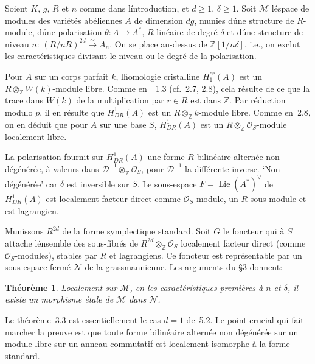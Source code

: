 \documentclass[11pt,a4paper]{article}
\theoremstyle{plain}
\newtheorem{theorem}{Th\'eor\`eme}
\theoremstyle{definition}
\DeclareMathOperator{\Lie}{Lie}
\begin{document}
Soient $K$, $g$, $R$ et $n$ comme dans l\'introduction, et $d \geq 1$, $\delta \geq 1$. Soit $\mathscr{M}$
l\'espace de modules des vari\'et\'es ab\'eliennes $A$ de dimension $dg$, munies d\'une
structure de $R$-module, d\'une polarisation $\theta: A \to A^*$, $R$-lin\'eaire de degr\'e $\delta$ et
d\'une structure de niveau $n$: $(R/nR)^{2d} \xrightarrow{\sim} A_n$. On se place au-dessus de $\mathbb{Z}[1/n\delta]$,
i.e., on exclut les caract\'eristiques divisant le niveau ou le degr\'e de la polarisation.

Pour $A$ sur un corps parfait $k$, l\'homologie cristalline $H^{cr}_1(A)$ est un
$R \otimes_\mathbb{Z} W(k)$-module libre. Comme en~\cite{Rapoport}~1.3 (cf.~2.7, 2.8), cela r\'esulte de ce que
la trace dans $W(k)$ de la multiplication par $r \in R$ est dans $\mathbb{Z}$. Par r\'eduction
modulo $p$, il en r\'esulte que $H^1_{DR}(A)$ est un $R \otimes_\mathbb{Z} k$-module libre. Comme en~2.8,
on en d\'eduit que pour $A$ sur une base $S$, $H^1_{DR}(A)$ est un $R \otimes_\mathbb{Z} \mathscr{O}_S$-module
localement libre.

La polarisation fournit sur $H^1_{DR}(A)$ une forme $R$-bilin\'eaire altern\'ee non
d\'eg\'en\'er\'ee, \`a valeurs dans $\mathscr{D}^{-1} \otimes_\mathbb{Z} \mathscr{O}_S$, pour $\mathscr{D}^{-1}$ la diff\'erente inverse. `Non
d\'eg\'en\'er\'ee' car $\delta$ est inversible sur $S$. Le sous-espace $F = \Lie(A^*)^\vee$ de $H^1_{DR}(A)$
est localement facteur direct
comme $\mathscr{O}_S$-module, un $R$-sous-module et est lagrangien.

Munissons $R^{2d}$ de la forme symplectique standard. Soit $G$ le foncteur qui \`a
$S$ attache l\'ensemble des sous-fibr\'es de $R^{2d} \otimes_\mathbb{Z} \mathscr{O}_S$ localement facteur direct
(comme $\mathscr{O}_S$-modules), stables par $R$ et lagrangiens. Ce foncteur est repr\'esentable
par un sous-espace ferm\'e $\mathscr{N}$ de la grassmannienne. Les arguments du \S3
donnent:

\begin{theorem}
Localement sur $\mathscr{M}$, en les caract\'eristiques premi\`eres \`a $n$ et $\delta$,
il existe un morphisme \'etale de $\mathscr{M}$ dans $\mathscr{N}$.
\end{theorem}

Le th\'eor\`eme~3.3 est essentiellement le cas $d=1$ de~5.2. Le point crucial qui
fait marcher la preuve est que toute forme bilin\'eaire altern\'ee non d\'eg\'en\'er\'ee sur
un module libre sur un anneau commutatif est localement isomorphe \`a la
forme standard.
\end{document}
